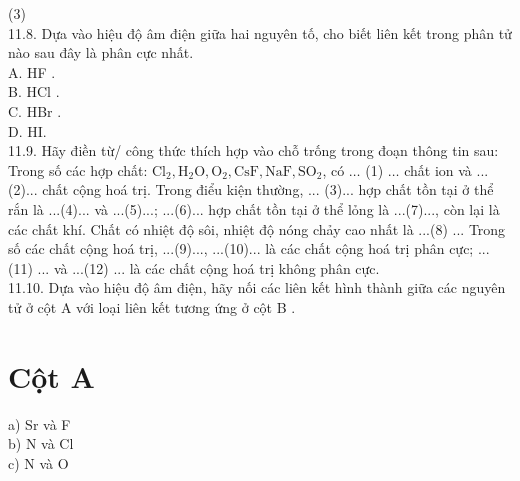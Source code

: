 \documentclass[10pt]{article}
\begin{document}
(3)\\
11.8. Dựa vào hiệu độ âm điện giữa hai nguyên tố, cho biết liên kết trong phân tử nào sau đây là phân cực nhất.\\
A. HF .\\
B. HCl .\\
C. HBr .\\
D. HI.\\
11.9. Hãy điền từ/ công thức thích hợp vào chỗ trống trong đoạn thông tin sau: Trong số các hợp chất: $\mathrm{Cl}_{2}, \mathrm{H}_{2} \mathrm{O}, \mathrm{O}_{2}, \mathrm{CsF}, \mathrm{NaF}, \mathrm{SO}_{2}$, có $\ldots$ (1) $\ldots$ chất ion và ...(2)... chất cộng hoá trị. Trong điểu kiện thường, ... (3)... hợp chất tồn tại ở thể rắn là ...(4)... và ...(5)...; ...(6)... hợp chất tồn tại ở thể lỏng là ...(7)..., còn lại là các chất khí. Chất có nhiệt độ sôi, nhiệt độ nóng chảy cao nhất là ...(8) ... Trong số các chất cộng hoá trị, ...(9)..., ...(10)... là các chất cộng hoá trị phân cực; ...(11) ... và ...(12) ... là các chất cộng hoá trị không phân cực.\\
11.10. Dựa vào hiệu độ âm điện, hãy nối các liên kết hình thành giữa các nguyên tử ở cột A với loại liên kết tương ứng ở cột B .

\section*{Cột A}
a) Sr và F\\
b) N và Cl\\
c) N và O
\end{document}
